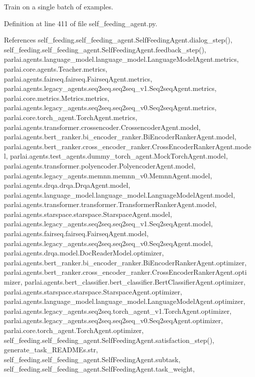 \begin{DoxyVerb}Train on a single batch of examples.\end{DoxyVerb}
 

Definition at line 411 of file self\+\_\+feeding\+\_\+agent.\+py.



References self\+\_\+feeding.\+self\+\_\+feeding\+\_\+agent.\+Self\+Feeding\+Agent.\+dialog\+\_\+step(), self\+\_\+feeding.\+self\+\_\+feeding\+\_\+agent.\+Self\+Feeding\+Agent.\+feedback\+\_\+step(), parlai.\+agents.\+language\+\_\+model.\+language\+\_\+model.\+Language\+Model\+Agent.\+metrics, parlai.\+core.\+agents.\+Teacher.\+metrics, parlai.\+agents.\+fairseq.\+fairseq.\+Fairseq\+Agent.\+metrics, parlai.\+agents.\+legacy\+\_\+agents.\+seq2seq.\+seq2seq\+\_\+v1.\+Seq2seq\+Agent.\+metrics, parlai.\+core.\+metrics.\+Metrics.\+metrics, parlai.\+agents.\+legacy\+\_\+agents.\+seq2seq.\+seq2seq\+\_\+v0.\+Seq2seq\+Agent.\+metrics, parlai.\+core.\+torch\+\_\+agent.\+Torch\+Agent.\+metrics, parlai.\+agents.\+transformer.\+crossencoder.\+Crossencoder\+Agent.\+model, parlai.\+agents.\+bert\+\_\+ranker.\+bi\+\_\+encoder\+\_\+ranker.\+Bi\+Encoder\+Ranker\+Agent.\+model, parlai.\+agents.\+bert\+\_\+ranker.\+cross\+\_\+encoder\+\_\+ranker.\+Cross\+Encoder\+Ranker\+Agent.\+model, parlai.\+agents.\+test\+\_\+agents.\+dummy\+\_\+torch\+\_\+agent.\+Mock\+Torch\+Agent.\+model, parlai.\+agents.\+transformer.\+polyencoder.\+Polyencoder\+Agent.\+model, parlai.\+agents.\+legacy\+\_\+agents.\+memnn.\+memnn\+\_\+v0.\+Memnn\+Agent.\+model, parlai.\+agents.\+drqa.\+drqa.\+Drqa\+Agent.\+model, parlai.\+agents.\+language\+\_\+model.\+language\+\_\+model.\+Language\+Model\+Agent.\+model, parlai.\+agents.\+transformer.\+transformer.\+Transformer\+Ranker\+Agent.\+model, parlai.\+agents.\+starspace.\+starspace.\+Starspace\+Agent.\+model, parlai.\+agents.\+legacy\+\_\+agents.\+seq2seq.\+seq2seq\+\_\+v1.\+Seq2seq\+Agent.\+model, parlai.\+agents.\+fairseq.\+fairseq.\+Fairseq\+Agent.\+model, parlai.\+agents.\+legacy\+\_\+agents.\+seq2seq.\+seq2seq\+\_\+v0.\+Seq2seq\+Agent.\+model, parlai.\+agents.\+drqa.\+model.\+Doc\+Reader\+Model.\+optimizer, parlai.\+agents.\+bert\+\_\+ranker.\+bi\+\_\+encoder\+\_\+ranker.\+Bi\+Encoder\+Ranker\+Agent.\+optimizer, parlai.\+agents.\+bert\+\_\+ranker.\+cross\+\_\+encoder\+\_\+ranker.\+Cross\+Encoder\+Ranker\+Agent.\+optimizer, parlai.\+agents.\+bert\+\_\+classifier.\+bert\+\_\+classifier.\+Bert\+Classifier\+Agent.\+optimizer, parlai.\+agents.\+starspace.\+starspace.\+Starspace\+Agent.\+optimizer, parlai.\+agents.\+language\+\_\+model.\+language\+\_\+model.\+Language\+Model\+Agent.\+optimizer, parlai.\+agents.\+legacy\+\_\+agents.\+seq2seq.\+torch\+\_\+agent\+\_\+v1.\+Torch\+Agent.\+optimizer, parlai.\+agents.\+legacy\+\_\+agents.\+seq2seq.\+seq2seq\+\_\+v0.\+Seq2seq\+Agent.\+optimizer, parlai.\+core.\+torch\+\_\+agent.\+Torch\+Agent.\+optimizer, self\+\_\+feeding.\+self\+\_\+feeding\+\_\+agent.\+Self\+Feeding\+Agent.\+satisfaction\+\_\+step(), generate\+\_\+task\+\_\+\+R\+E\+A\+D\+M\+Es.\+str, self\+\_\+feeding.\+self\+\_\+feeding\+\_\+agent.\+Self\+Feeding\+Agent.\+subtask, self\+\_\+feeding.\+self\+\_\+feeding\+\_\+agent.\+Self\+Feeding\+Agent.\+task\+\_\+weight, 